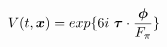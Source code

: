\begin{equation}
V(t,\mbox{\boldmath$x$})= exp \{ 6i~\mbox{\boldmath$\tau$} \cdot \frac{\mbox{\boldmath$\phi$}}{F_\pi} \}
\end{equation}

